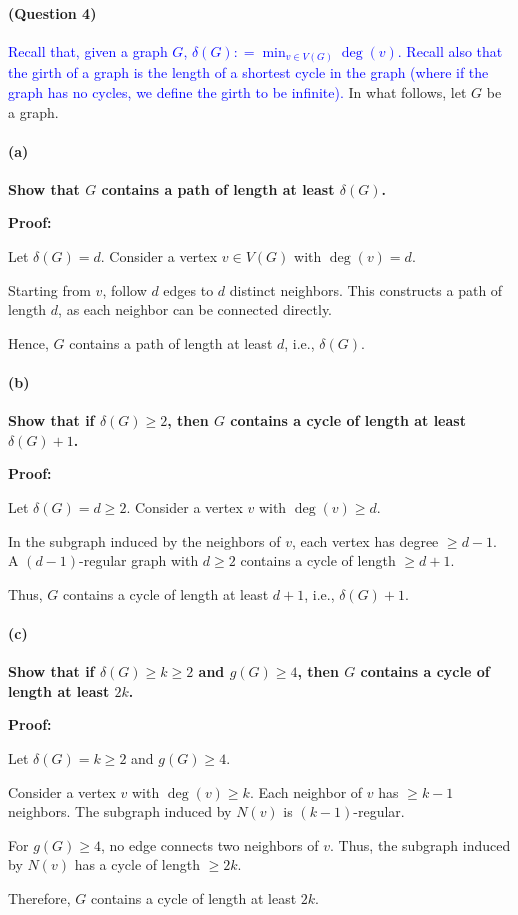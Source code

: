 \documentclass[12 pt]{article}
\begin{document}
\paragraph{(Question 4)} \textcolor{blue}{Recall that, given a graph $G$, $\delta(G) : = \min_{v \in V(G)} \deg(v)$. Recall also that the girth of a graph is the length of a shortest cycle in the graph (where if the graph has no cycles, we define the girth to be infinite).} In what follows, let $G$ be a graph.
\paragraph{(a)} \textbf{Show that \( G \) contains a path of length at least \( \delta(G) \).}

\textbf{Proof:}

Let \( \delta(G) = d \). Consider a vertex \( v \in V(G) \) with \( \deg(v) = d \). 

Starting from \( v \), follow \( d \) edges to \( d \) distinct neighbors. This constructs a path of length \( d \), as each neighbor can be connected directly.

Hence, \( G \) contains a path of length at least \( d \), i.e., \( \delta(G) \).

\paragraph{(b)} \textbf{Show that if \( \delta(G) \geq 2 \), then \( G \) contains a cycle of length at least \( \delta(G) + 1 \).}

\textbf{Proof:}

Let \( \delta(G) = d \geq 2 \). Consider a vertex \( v \) with \( \deg(v) \geq d \).

In the subgraph induced by the neighbors of \( v \), each vertex has degree \( \geq d - 1 \). A \( (d - 1) \)-regular graph with \( d \geq 2 \) contains a cycle of length \( \geq d + 1 \).

Thus, \( G \) contains a cycle of length at least \( d + 1 \), i.e., \( \delta(G) + 1 \).

\paragraph{(c)} \textbf{Show that if \( \delta(G) \geq k \geq 2 \) and \( g(G) \geq 4 \), then \( G \) contains a cycle of length at least \( 2k \).}

\textbf{Proof:}

Let \( \delta(G) = k \geq 2 \) and \( g(G) \geq 4 \). 

Consider a vertex \( v \) with \( \deg(v) \geq k \). Each neighbor of \( v \) has \( \geq k - 1 \) neighbors. The subgraph induced by \( N(v) \) is \( (k - 1) \)-regular.

For \( g(G) \geq 4 \), no edge connects two neighbors of \( v \). Thus, the subgraph induced by \( N(v) \) has a cycle of length \( \geq 2k \).

Therefore, \( G \) contains a cycle of length at least \( 2k \).
\end{document}

